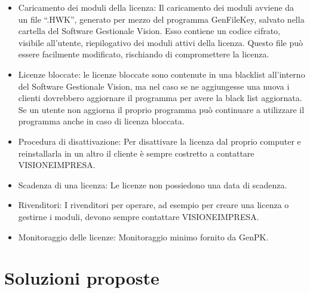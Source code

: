\begin{itemize}
\item Caricamento dei moduli della licenza: Il caricamento dei moduli avviene da un file “.HWK”, generato per mezzo del programma GenFileKey, salvato nella cartella del Software Gestionale Vision. Esso contiene un codice cifrato, visibile all’utente, riepilogativo dei moduli attivi della licenza. Questo file può essere facilmente modificato, rischiando di compromettere la licenza. 
\item Licenze bloccate: le licenze bloccate sono contenute in una blacklist all’interno del Software Gestionale Vision, ma nel caso se ne aggiungesse una nuova i clienti dovrebbero aggiornare il programma per avere la black list aggiornata. Se un utente non aggiorna il proprio programma può continuare a utilizzare il programma anche in caso di licenza bloccata. 
\item Procedura di disattivazione: Per disattivare la licenza dal proprio computer e reinstallarla in un altro il cliente è sempre costretto a contattare VISIONEIMPRESA. 
\item Scadenza di una licenza: Le licenze non possiedono una data di scadenza.
\item Rivenditori: I rivenditori per operare, ad esempio per creare una licenza o gestirne i moduli, devono sempre contattare VISIONEIMPRESA.
\item Monitoraggio delle licenze: Monitoraggio minimo fornito da GenPK.

\end{itemize}


\section{Soluzioni proposte}

